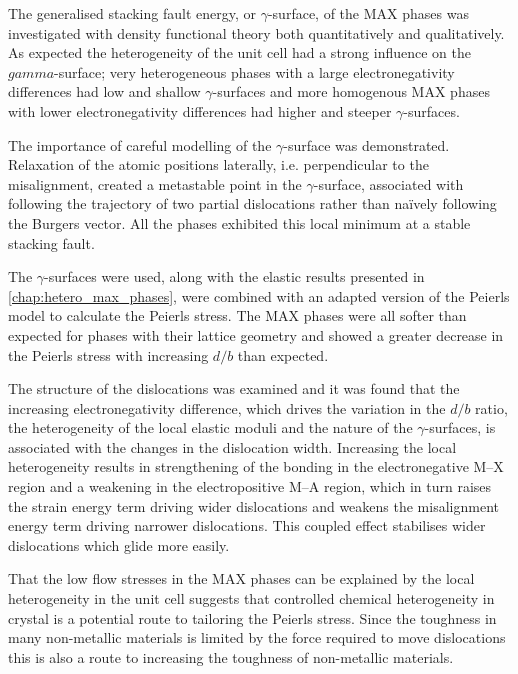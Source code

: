 The generalised stacking fault energy, or $\gamma$-surface, of the MAX phases was investigated with density functional theory both quantitatively and qualitatively. As expected the heterogeneity of the unit cell had a strong influence on the $gamma$-surface; very heterogeneous phases with a large electronegativity differences had low and shallow $\gamma$-surfaces and more homogenous MAX phases with lower electronegativity differences had higher and steeper $\gamma$-surfaces.

The importance of careful modelling of the $\gamma$-surface was demonstrated. Relaxation of the atomic positions laterally, i.e. perpendicular to the misalignment, created a metastable point in the $\gamma$-surface, associated with following the trajectory of two partial dislocations rather than na\"{i}vely following the Burgers vector. All the phases exhibited this local minimum at a stable stacking fault.

The $\gamma$-surfaces were used, along with the elastic results presented in \autoref{chap:hetero_max_phases}, were combined with an adapted version of the Peierls model to calculate the Peierls stress. The MAX phases were all softer than expected for phases with their lattice geometry and showed a greater decrease in the Peierls stress with increasing $d/b$ than expected.

The structure of the dislocations was examined and it was found that the increasing electronegativity difference, which drives the variation in the $d/b$ ratio, the heterogeneity of the local elastic moduli and the nature of the $\gamma$-surfaces, is associated with the changes in the dislocation width. Increasing the local heterogeneity results in strengthening of the bonding in the electronegative M--X region and a weakening in the electropositive M--A region, which in turn raises the strain energy term driving wider dislocations and weakens the misalignment energy term driving narrower dislocations. This coupled effect stabilises wider dislocations which glide more easily.


That the low flow stresses in the MAX phases can be explained by the local heterogeneity in the unit cell suggests that controlled chemical heterogeneity in crystal is a potential route to tailoring the Peierls stress. Since the toughness in many non-metallic materials is limited by the force required to move dislocations this is also a route to increasing the toughness of non-metallic materials.






























